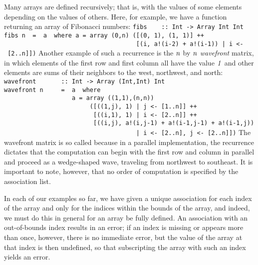 Many arrays are defined recursively; that is, with the values of some
elements depending on the values of others.  Here, for example, we
have a function returning an array of Fibonacci numbers:
\bprog
\mbox{\tt fibs\ \ \ \ ::\ Int\ ->\ Array\ Int\ Int}\\
\mbox{\tt fibs\ n\ \ =\ \ a\ \ where\ a\ =\ array\ (0,n)\ ([(0,\ 1),\ (1,\ 1)]\ ++\ }\\
\mbox{\tt \ \ \ \ \ \ \ \ \ \ \ \ \ \ \ \ \ \ \ \ \ \ \ \ \ \ \ \ \ \ \ \ \ \ \ \ \ [(i,\ a!(i-2)\ +\ a!(i-1))\ |\ i\ <-\ [2..n]])}
\eprog
Another example of such a recurrence is the \mbox{$\it n$} by \mbox{$\it n$} {\em wavefront}
matrix, in which elements of the first row and first column all have
the value \mbox{$\it 1$} and other elements are sums of their neighbors to the
west, northwest, and north:
\bprog
\mbox{\tt wavefront\ \ \ \ \ \ \ ::\ Int\ ->\ Array\ (Int,Int)\ Int}\\
\mbox{\tt wavefront\ n\ \ \ \ \ =\ \ a\ \ where}\\
\mbox{\tt \ \ \ \ \ \ \ \ \ \ \ \ \ \ \ \ \ \ \ a\ =\ array\ ((1,1),(n,n))}\\
\mbox{\tt \ \ \ \ \ \ \ \ \ \ \ \ \ \ \ \ \ \ \ \ \ \ \ \ ([((1,j),\ 1)\ |\ j\ <-\ [1..n]]\ ++}\\
\mbox{\tt \ \ \ \ \ \ \ \ \ \ \ \ \ \ \ \ \ \ \ \ \ \ \ \ \ [((i,1),\ 1)\ |\ i\ <-\ [2..n]]\ ++}\\
\mbox{\tt \ \ \ \ \ \ \ \ \ \ \ \ \ \ \ \ \ \ \ \ \ \ \ \ \ [((i,j),\ a!(i,j-1)\ +\ a!(i-1,j-1)\ +\ a!(i-1,j))}\\
\mbox{\tt \ \ \ \ \ \ \ \ \ \ \ \ \ \ \ \ \ \ \ \ \ \ \ \ \ \ \ \ \ \ \ \ \ \ \ \ \ |\ i\ <-\ [2..n],\ j\ <-\ [2..n]])}
\eprog
The wavefront matrix is so called because in a parallel
implementation, the recurrence dictates that the computation can begin
with the first row and column in parallel and proceed as a
wedge-shaped wave, traveling from northwest to southeast.  It is
important to note, however, that no order of computation is specified
by the association list.

In each of our examples so far, we have given a unique association for
each index of the array and only for the indices within the bounds
of the array, and indeed, we must do this in general for an array
be fully defined.  An association with an out-of-bounds index results
in an error; if an index is missing or appears more than once, however,
there is no immediate error, but the value of the array at that index
is then undefined, so that subscripting the array with such an index
yields an error.

